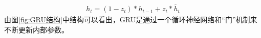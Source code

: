 \begin{equation}
    \begin{aligned}
        h_t = (1- z_t) * h_{t-1} + z_t * \widetilde{h_t}
    \end{aligned}
\end{equation}
由图\ref{fig:GRU结构}中结构可以看出\cite{rnn-structure}，GRU是通过一个循环神经网络和“门”机制来不断更新内部参数。


